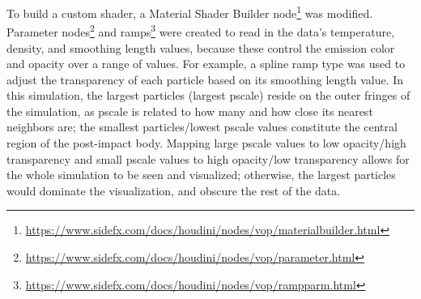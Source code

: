 \documentclass[fleqn,usenatbib,useAMS]{mnras}
\begin{document}
To build a custom shader, a Material Shader Builder node\footnote{\url{https://www.sidefx.com/docs/houdini/nodes/vop/materialbuilder.html}} was modified. Parameter nodes\footnote{\url{https://www.sidefx.com/docs/houdini/nodes/vop/parameter.html}} and ramps\footnote{\url{https://www.sidefx.com/docs/houdini/nodes/vop/rampparm.html}} were created to read in the data's temperature, density, and smoothing length values, because these control the emission color and opacity over a range of values. For example, a spline ramp type was used to adjust the transparency of each particle based on its smoothing length value. In this simulation, the largest particles (largest pscale) reside on the outer fringes of the simulation, as pscale is related to how many and how close its nearest neighbors are; the smallest particles/lowest pscale values constitute the central region of the post-impact body. Mapping large pscale values to low opacity/high transparency and small pscale values to high opacity/low transparency allows for the whole simulation to be seen and visualized; otherwise, the largest particles would dominate the visualization, and obscure the rest of the data. \par
\end{document}
